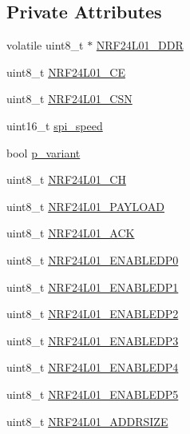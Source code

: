 \subsection*{Private Attributes}
\begin{DoxyCompactItemize}
\item 
volatile uint8\+\_\+t $\ast$ \hyperlink{classNRF24L01_a42ef1a6d858a115327d0a7310aaba57c}{N\+R\+F24\+L01\+\_\+\+D\+DR}
\item 
uint8\+\_\+t \hyperlink{classNRF24L01_a56a20345fcb667fcfc9bc1cb62d5152f}{N\+R\+F24\+L01\+\_\+\+CE}
\item 
uint8\+\_\+t \hyperlink{classNRF24L01_a4d36b61597b9919dd4a0ecdc53526020}{N\+R\+F24\+L01\+\_\+\+C\+SN}
\item 
uint16\+\_\+t \hyperlink{classNRF24L01_a4701641c1e8b3d082deb03f93c84d8c7}{spi\+\_\+speed}
\item 
bool \hyperlink{classNRF24L01_a082a99d802a3f2335da94e67cf8440ea}{p\+\_\+variant}
\item 
uint8\+\_\+t \hyperlink{classNRF24L01_a2f5e84525760899949446db94d225700}{N\+R\+F24\+L01\+\_\+\+CH}
\item 
uint8\+\_\+t \hyperlink{classNRF24L01_a6f035e7c49d8ed5e1ab84242cef0e9be}{N\+R\+F24\+L01\+\_\+\+P\+A\+Y\+L\+O\+AD}
\item 
uint8\+\_\+t \hyperlink{classNRF24L01_af2e0a88f330c86d0cc6c43180f70ecbd}{N\+R\+F24\+L01\+\_\+\+A\+CK}
\item 
uint8\+\_\+t \hyperlink{classNRF24L01_a10c710f3795c47ebde120ca3d975c891}{N\+R\+F24\+L01\+\_\+\+E\+N\+A\+B\+L\+E\+D\+P0}
\item 
uint8\+\_\+t \hyperlink{classNRF24L01_a8ebd82a57efbaa5928a56ba6780740de}{N\+R\+F24\+L01\+\_\+\+E\+N\+A\+B\+L\+E\+D\+P1}
\item 
uint8\+\_\+t \hyperlink{classNRF24L01_aac40f597790cf3a62b382f919f1293ce}{N\+R\+F24\+L01\+\_\+\+E\+N\+A\+B\+L\+E\+D\+P2}
\item 
uint8\+\_\+t \hyperlink{classNRF24L01_aea0d090c7d6da9b137ce4ce3690535e8}{N\+R\+F24\+L01\+\_\+\+E\+N\+A\+B\+L\+E\+D\+P3}
\item 
uint8\+\_\+t \hyperlink{classNRF24L01_a4f19e32ed3324724d3478b9f841a2790}{N\+R\+F24\+L01\+\_\+\+E\+N\+A\+B\+L\+E\+D\+P4}
\item 
uint8\+\_\+t \hyperlink{classNRF24L01_ae77cf1829f80c703e36ef57b6d23e9a9}{N\+R\+F24\+L01\+\_\+\+E\+N\+A\+B\+L\+E\+D\+P5}
\item 
uint8\+\_\+t \hyperlink{classNRF24L01_a0b5c60487c6b715b9f17f968f7958d93}{N\+R\+F24\+L01\+\_\+\+A\+D\+D\+R\+S\+I\+ZE}

\end{DoxyCompactItemize}
